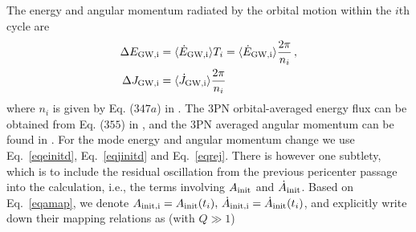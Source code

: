 \documentclass[prd,aps,floatfix,superscriptaddress,nofootinbib,twocolumn,10pt,English]{revtex4}
\begin{document}
The energy and angular momentum radiated by the orbital motion within the $i$th cycle are
\begin{align}\label{eqDEJmap}
\Delta E_{\rm GW,i}  & = \langle \dot{E}_{\rm GW,i}\rangle T_i = \langle \dot{E}_{\rm GW,i}\rangle \frac{2 \pi}{n_i}\,,\nonumber \\
\Delta J_{\rm GW,i}  & =  \langle \dot{J}_{\rm GW,i}\rangle \frac{2 \pi}{n_i}
\end{align} 
where $n_i$ is given by Eq. ($347a$) in \cite{blanchet2014gravitational}. The 3PN orbital-averaged energy flux can be obtained from Eq. ($355$) in \cite{blanchet2014gravitational},
and the 3PN averaged angular momentum can be found in \cite{arun2009third}. For the mode energy and angular momentum change we use Eq.~\eqref{eqeinitd}, Eq.~\eqref{eqjinitd} and Eq.~\eqref{eqrej}. There is however one subtlety, which is to include the residual oscillation from the previous pericenter passage into the calculation, i.e., the terms involving $A_{\rm init}$ and $\dot{A}_{\rm init}$.
Based on Eq.~\eqref{eqamap}, we denote $A_{\rm init,i}=A_{\rm init}(t_i),\, \dot{A}_{\rm init,i} = \dot{A}_{\rm init}(t_i)$, and explicitly write down their mapping relations as (with $Q \gg 1$)
\end{document}
